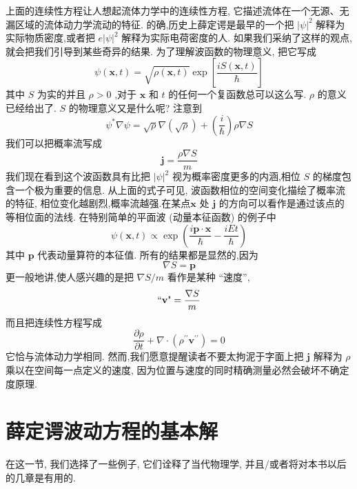 上面的连续性方程让人想起流体力学中的连续性方程, 它描述流体在一个无源、无漏区域的流体动力学流动的特征. 的确,历史上薛定谔是最早的一个把 ${\left| \psi \right| }^{2}$ 解释为实际物质密度,或者把 $e{\left| \psi \right| }^{2}$ 解释为实际电荷密度的人. 如果我们采纳了这样的观点,就会把我们引导到某些奇异的结果.
为了理解波函数的物理意义, 把它写成
\begin{equation}
\psi \left( {\mathbf{x}, t}\right) = \sqrt{\rho \left( {\mathbf{x}, t}\right) }\exp \left\lbrack \frac{{iS}\left( {\mathbf{x}, t}\right) }{\hbar }\right\rbrack
\end{equation}
其中 $S$ 为实的并且 $\rho > 0$ ,对于 $\mathbf{x}$ 和 $t$ 的任何一个复函数总可以这么写. $\rho$ 的意义已经给出了. $S$ 的物理意义又是什么呢? 注意到
\begin{equation}
{\psi }^{ * }\nabla \psi = \sqrt{\rho }\nabla \left( \sqrt{\rho }\right) + \left( \frac{i}{\hbar }\right) \rho \nabla S
\end{equation}
我们可以把概率流写成
\begin{equation}
\mathbf{j} = \frac{\rho \nabla S}{m}
\end{equation}
我们现在看到这个波函数具有比把 ${\left| \psi \right| }^{2}$ 视为概率密度更多的内涵,相位 $S$ 的梯度包含一个极为重要的信息. 从上面的式子可见, 波函数相位的空间变化描绘了概率流的特征, 相位变化越剧烈,概率流越强.在某点$\mathbf{x}$ 处 $\mathbf{j}$ 的方向可以看作是通过该点的等相位面的法线. 在特别简单的平面波 (动量本征函数) 的例子中
\begin{equation}
\psi \left( {\mathbf{x}, t}\right) \propto \exp \left( {\frac{i\mathbf{p} \cdot \mathbf{x}}{\hbar } - \frac{iEt}{\hbar }}\right) 
\end{equation}
其中 $\mathbf{p}$ 代表动量算符的本征值. 所有的结果都是显然的,因为
\begin{equation}
\nabla S = \mathbf{p}
\end{equation}
更一般地讲,使人感兴趣的是把 $\nabla S/m$ 看作是某种 “速度”,
\begin{equation}
\text{``\textbf{v}"}= \frac{\nabla S}{m}
\end{equation}
而且把连续性方程写成
\begin{equation}
\frac{\partial \rho }{\partial t} + \nabla \cdot \left( {{\rho }^{\prime \prime }{\mathbf{v}}^{\prime \prime }}\right) = 0
\end{equation}
它恰与流体动力学相同. 然而,我们愿意提醒读者不要太拘泥于字面上把 $\mathbf{j}$ 解释为 $\rho$ 乘以在空间每一点定义的速度, 因为位置与速度的同时精确测量必然会破坏不确定度原理.
\section{薛定谔波动方程的基本解}
在这一节, 我们选择了一些例子, 它们诠释了当代物理学, 并且/或者将对本书以后的几章是有用的.
